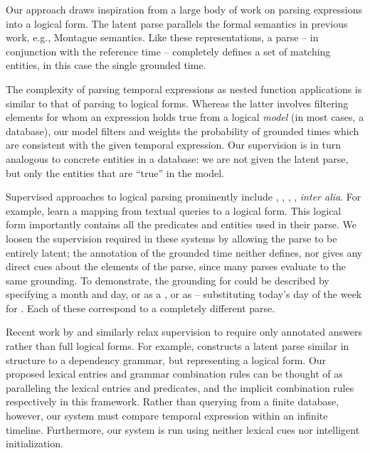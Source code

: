 Our approach draws inspiration from a large body of work
	on parsing expressions into a logical form.
The latent parse parallels the formal semantics in previous work,
	e.g., Montague semantics.
Like these representations, a parse -- in conjunction with
	the reference time -- completely defines a set of
	matching entities, in this case the single grounded time.

The complexity of parsing temporal expressions as nested function
	applications is similar to that of parsing to logical forms.
Whereas the latter involves filtering elements for whom an expression
	holds true from a logical \textit{model} (in most cases, a database),
	our model filters and weights the probability of grounded times
	which are consistent with the given temporal expression.
Our supervision is in turn analogous to concrete entities in a database:
	we are not given the latent parse, but only the entities that
	are ``true'' in the model.

Supervised approaches to logical parsing prominently include
	,
	,
	, 
	, 
	\textit{inter alia}.
For example,  learn a mapping from
	textual queries to a logical form.
This logical form importantly contains all the predicates and entities
	used in their parse.
We loosen the supervision required in these systems by allowing the parse to
	be entirely latent;
	the annotation of the grounded time neither defines, nor gives any
	direct cues about the elements of the parse, since many parses evaluate
	to the same grounding.
To demonstrate, the grounding for  could be
	described by specifying a month and day, or as a , or as  -- substituting today's day of the week for .
Each of these correspond to a completely different parse.

Recent work by  and 
	 similarly relax supervision 
	to require only annotated answers rather than full logical forms.
For example,  constructs a latent parse
	similar in structure to a dependency grammar, but representing a logical
	form.
Our proposed lexical entries and grammar combination rules can be thought of as
	paralleling the lexical entries and predicates, and the implicit combination 
	rules respectively in this framework.
Rather than querying from a finite database, however, our system must compare
	temporal expression within an infinite timeline.
Furthermore, our system is run using neither lexical cues nor intelligent
	initialization.


